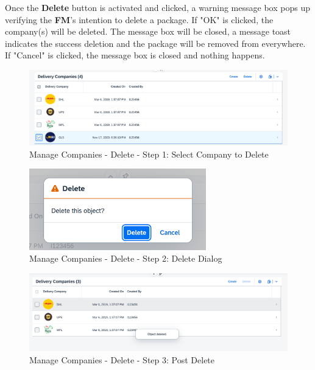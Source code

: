 Once the \textbf{Delete} button is activated and clicked, a warning message box pops up verifying the \textbf{FM}'s intention to delete a package. If "OK" is clicked, the company(s) will be deleted. The message box will be closed, a message toast indicates the success deletion and the package will be removed from everywhere. If "Cancel" is clicked, the message box is closed and nothing happens.

\begin{figure}[H]
	\centering
	\includegraphics[width=0.90\linewidth]{images/user_doc/company/report/deleteBtnEnable.png}
	\caption{Manage Companies - Delete - Step 1: Select Company to Delete}
	\label{fig:MCReportDeleteStep1}
\end{figure}

\begin{figure}[H]
	\centering
	\includegraphics[height=100pt]{images/user_doc/company/report/deleteConfirmaton2.png}
	\caption{Manage Companies - Delete - Step 2: Delete Dialog}
	\label{fig:MCReportDeleteDlg}
\end{figure}

\begin{figure}[H]
	\centering
	\includegraphics[width=0.90\linewidth]{images/user_doc/company/report/deleteToast.png}
	\caption{Manage Companies - Delete - Step 3: Post Delete}
	\label{fig:MCReportDeleteStep3}
\end{figure}

